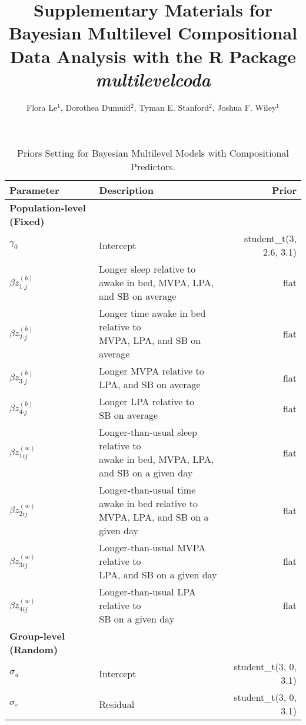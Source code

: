 \documentclass[man, 12pt, floatsintext]{apa7}
\title{Supplementary Materials for \\ 
Bayesian Multilevel Compositional Data Analysis with the R Package \textbf{\textit{multilevelcoda}}}
\author{
Flora Le\orcidlink{0000-0003-0089-8167}$^1$, 
Dorothea Dumuid\orcidlink{0000-0003-3057-0963}$^2$, 
Tyman E. Stanford\orcidlink{0000-0002-8570-5493}$^2$, 
Joshua F. Wiley\orcidlink{0000-0002-0271-6702}$^1$
}
\begin{document}
\maketitle
\begin{table}[!htbp]
  \caption{Priors Setting for Bayesian Multilevel Models with Compositional Predictors.}
  \centering
    {\renewcommand{\arraystretch}{1.25}%
    \setlength\tabcolsep{0pt}
    \begin{tabular*}{\linewidth}{@{\extracolsep{\fill}} llr }
    \toprule
    Parameter &  Description  & Prior  \\
    \midrule
    \textbf{Population-level (Fixed)} && \\
    $\gamma_0$  &     Intercept                  & student\_t(3, 2.6, 3.1) \\
    $\beta{z{^{(b)}_{1    \pmb{\cdot} j}}}$ &
    \makecell[l]{Longer sleep relative to \\
    awake in bed, MVPA, LPA, and SB on average}  & flat           \\ 
    $\beta{z{^{(b)}_{2    \pmb{\cdot} j}}}$ &
    \makecell[l]{Longer time awake in bed relative to \\
    MVPA, LPA, and SB on average}  & flat                         \\  
    $\beta{z{^{(b)}_{3    \pmb{\cdot} j}}}$  &
    \makecell[l]{Longer MVPA relative to \\
    LPA, and SB on average} & flat                         \\
    $\beta{z{^{(b)}_{4    \pmb{\cdot} j}}}$  &
    \makecell[l]{Longer LPA relative to \\
    SB on average}  & flat                         \\
    $\beta{z{^{(w)}_{1ij}}}$ &
    \makecell[l]{Longer-than-usual sleep relative to \\
    awake in bed, MVPA, LPA, and SB on a given day}   & flat                         \\
    $\beta{z{^{(w)}_{2ij}}}$  &
    \makecell[l]{Longer-than-usual time awake in bed relative to \\
    MVPA, LPA, and SB on a given day}    & flat                         \\
    $\beta{z{^{(w)}_{3ij}}}$  &
    \makecell[l]{Longer-than-usual MVPA relative to \\
    LPA, and SB on a given day}    & flat                         \\   
    $\beta{z{^{(w)}_{4ij}}}$ &
    \makecell[l]{Longer-than-usual LPA relative to \\
    SB on a given day}  & flat                         \\
    \midrule
    \textbf{Group-level (Random)} && \\
    $\sigma_{u}$ & Intercept & student\_t(3, 0, 3.1)   \\
    $\sigma_{\varepsilon}$ & Residual & student\_t(3, 0, 3.1)  \\
    \bottomrule
  \end{tabular*}}
\label{tab-brmcoda-sbp-prior}
\end{table}
\end{document}
